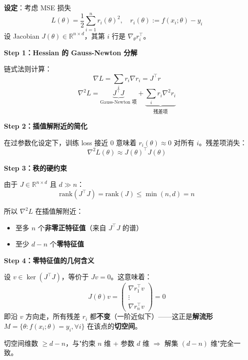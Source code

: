 \documentclass[12pt, a4paper]{ctexart}
\begin{document}
\begin{blackboard}

\textbf{设定}：考虑 MSE 损失
\[
L(\theta) = \frac{1}{2}\sum_{i=1}^{n} r_i(\theta)^2, \quad r_i(\theta) := f(x_i; \theta) - y_i
\]
设 Jacobian $J(\theta) \in \mathbb{R}^{n \times d}$，其第 $i$ 行是 $\nabla_\theta r_i^\top$。

\textbf{Step 1：Hessian 的 Gauss-Newton 分解}

链式法则计算：
\[
\nabla L = \sum_i r_i \nabla r_i = J^\top r
\]
\[
\nabla^2 L = \underbrace{J^\top J}_{\text{Gauss-Newton 项}} + \underbrace{\sum_i r_i \nabla^2 r_i}_{\text{残差项}}
\]

\textbf{Step 2：插值解附近的简化}

在过参数化设定下，训练 loss 接近 0 意味着 $r_i(\theta) \approx 0$ 对所有 $i$。残差项消失：
\[
\boxed{\nabla^2 L(\theta) \approx J(\theta)^\top J(\theta)}
\]

\textbf{Step 3：秩的硬约束}

由于 $J \in \mathbb{R}^{n \times d}$ 且 $d \gg n$：
\[
\text{rank}(J^\top J) = \text{rank}(J) \leq \min(n, d) = n
\]

所以 $\nabla^2 L$ 在插值解附近：
\begin{itemize}
    \item 至多 $n$ 个\textbf{非零正特征值}（来自 $J^\top J$ 的谱）
    \item 至少 $d - n$ 个\textbf{零特征值}
\end{itemize}

\textbf{Step 4：零特征值的几何含义}

设 $v \in \ker(J^\top J)$，等价于 $Jv = 0$。这意味着：
\[
J(\theta) v = \begin{pmatrix} \nabla r_1^\top v \\ \vdots \\ \nabla r_n^\top v \end{pmatrix} = 0
\]
即沿 $v$ 方向走，所有残差 $r_i$ 都\textbf{不变}（一阶近似下）——这正是\textbf{解流形} $M = \{\theta : f(x_i; \theta) = y_i, \forall i\}$ 在该点的\textbf{切空间}。

切空间维数 $\geq d - n$，与"约束 $n$ 维 + 参数 $d$ 维 $\Rightarrow$ 解集 $(d-n)$ 维"完全一致。

\end{blackboard}
\end{document}

